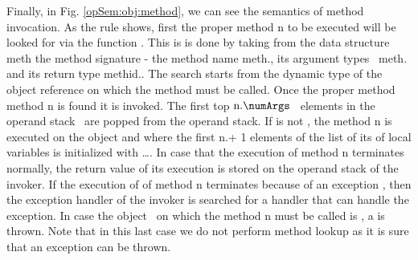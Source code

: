        Finally, in Fig. \ref{opSem:obj:method}, we can see the semantics of method invocation. 
       As the rule shows, first the proper method \mbox{\rm n} to be executed will be looked for via the function \lookupOnly. 
       This is is done by taking from the data structure  \mbox{\rm meth} the method signature - the method name \mbox{\rm  meth}.\methodName, 
       its argument types \ \mbox{\rm meth}.\args{}  and its  return type \mbox{\rm methid}.\retType. 
       The search starts from the dynamic type of the object reference on which the method must be called.
       Once  the proper method method \mbox{\rm n} is found it is invoked.
	 The first top $\mbox{\rm n}.\numArgs$ \ elements in the operand stack \stackOnly \ are popped from the operand stack. If 
          is not \Mynull, the  method   \mbox{\rm n}  is executed on the object    
	 and where the first \mbox{\rm n}.\numArgs + 1 elements of the list of its of local variables is initialized with 
          \ldots \stackOnlyParam{\counterOnly}. In case that the execution of method \mbox{\rm n}
	 terminates normally, the return value \Res{}  of its execution is stored on the operand stack of the invoker. 
	 If the execution of of method \mbox{\rm n} terminates because of an exception \Exc, then the exception handler of the invoker is searched for
	 a handler that can handle the exception. In case the object   \  on which the  method \mbox{\rm n} must be 
	 called is \Mynull, a \NullPointerExc{} is thrown. Note that in this last case we do not perform method lookup as it is sure that an exception can be thrown.  			


